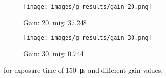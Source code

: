\begin{figure}[h]
    \begin{subfigure}[b]{0.4\textwidth}
        \centering
        \texttt{[image: images/g\_results/gain\_20.png]}
        \caption{Gain: 20, \gls{mig}: 37.248}
        \label{subfig:underexposed.png}
    \end{subfigure}
    \hspace{1cm}
    \begin{subfigure}[b]{0.4\textwidth}
        \centering
        \texttt{[image: images/g\_results/gain\_30.png]}
        \caption{Gain: 30, \gls{mig}: 0.744}
        \label{subfig:underexposed.png}
    \end{subfigure}
    \caption{ for exposure time of \SI{150}{\micro\second} and different gain values.}
    \label{fig:example_images_gain}
\end{figure}